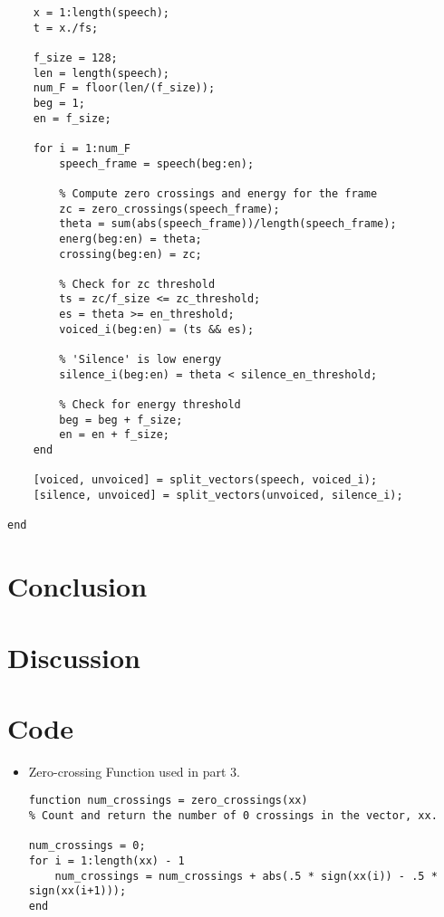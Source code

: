 \documentclass[11pt]{article}
\begin{document}
\begin{enumerate}
\begin{lstlisting}
    x = 1:length(speech);
    t = x./fs;

    f_size = 128;
    len = length(speech);
    num_F = floor(len/(f_size));
    beg = 1;
    en = f_size;

    for i = 1:num_F
        speech_frame = speech(beg:en);

        % Compute zero crossings and energy for the frame
        zc = zero_crossings(speech_frame);
        theta = sum(abs(speech_frame))/length(speech_frame);
        energ(beg:en) = theta;
        crossing(beg:en) = zc;

        % Check for zc threshold
        ts = zc/f_size <= zc_threshold;
        es = theta >= en_threshold;
        voiced_i(beg:en) = (ts && es);

        % 'Silence' is low energy
        silence_i(beg:en) = theta < silence_en_threshold;

        % Check for energy threshold
        beg = beg + f_size;
        en = en + f_size;
    end

    [voiced, unvoiced] = split_vectors(speech, voiced_i); 
    [silence, unvoiced] = split_vectors(unvoiced, silence_i);

end
\end{lstlisting}


\end{enumerate}



\section{Conclusion}



\section{Discussion}



\section{Code}

\begin{itemize}
\item Zero-crossing Function used in part 3.
\begin{lstlisting}
function num_crossings = zero_crossings(xx)
% Count and return the number of 0 crossings in the vector, xx.

num_crossings = 0;
for i = 1:length(xx) - 1
    num_crossings = num_crossings + abs(.5 * sign(xx(i)) - .5 * sign(xx(i+1)));
end
\end{lstlisting}

\end{itemize}
\end{document}
